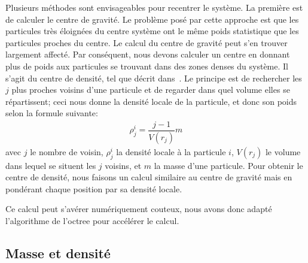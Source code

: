 			Plusieurs méthodes sont envisageables pour recentrer le système. La première est de calculer le
			centre de gravité. Le problème posé par cette approche est que les particules très éloignées du
			centre système ont le même poids statistique que les particules proches du centre.
			Le calcul du centre de gravité peut s'en trouver largement affecté.
			Par conséquent, nous devons calculer un centre en donnant plus de poids aux
			particules se trouvant dans des zones denses du système. Il s'agit du \og centre de densité\fg,
			tel que décrit dans~\citet{1985ApJ...298...80C}. Le principe est de rechercher les $j$ plus
			proches voisins d'une particule et de regarder dans quel volume elles se répartissent; ceci nous
			donne la densité locale de la particule, et donc son poids selon la formule suivante:
			\begin{align}
				\rho_j^i = \dfrac{j-1}{V(r_j)}m
			\end{align}
			avec $j$ le nombre de voisin, $\rho_j^i$ la densité locale à la particule $i$, $V(r_j)$ le volume
			dans lequel se situent les $j$ voisins, et $m$ la masse d'une particule. Pour obtenir le centre
			de densité,
			nous faisons un calcul similaire au centre de gravité mais en pondérant chaque position par sa densité locale.

			Ce calcul peut s'avérer numériquement couteux, nous avons  donc adapté l'algorithme de l'octree
			pour accélérer le calcul.

		\subsection{Masse et densité}

